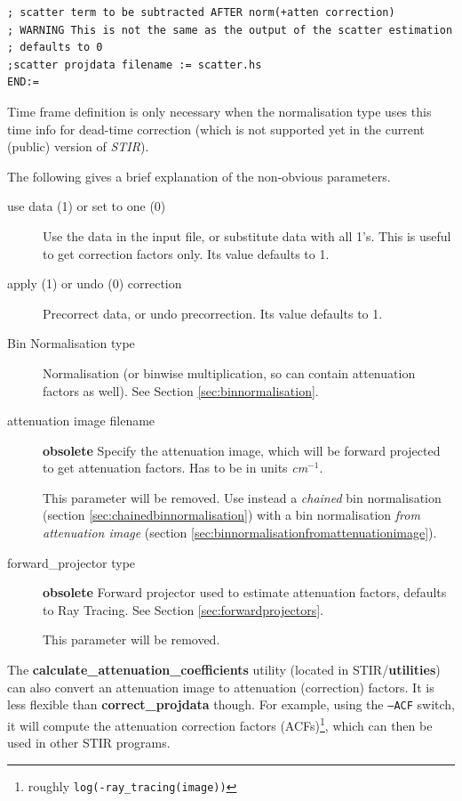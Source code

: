 \documentclass{article}
\begin{document}
{{\begin{verbatim}
; scatter term to be subtracted AFTER norm(+atten correction)
; WARNING This is not the same as the output of the scatter estimation
; defaults to 0 
;scatter projdata filename := scatter.hs
END:=
\end{verbatim}


Time frame definition is only necessary when the normalisation 
type uses this time info for dead-time correction (which is not 
supported yet in the current (public) version of \textit{STIR}).


The following gives a brief explanation of the non-obvious parameters. 

\begin{description}

\item[use data (1) or set to one (0)]
Use the data in the input file, or substitute data with all 1's. 
This is useful to get correction factors only. Its value defaults 
to 1.

\item[apply (1) or undo (0) correction]
Precorrect data, or undo precorrection. Its value defaults to 
1.

\item[Bin Normalisation type]
Normalisation (or binwise multiplication, so can contain attenuation 
factors as well). See Section \ref{sec:binnormalisation}.


\item[attenuation image filename] \textbf{obsolete}
Specify the attenuation image, which will be forward projected 
to get attenuation factors. Has to be in units \textit{cm}$^{\mathit{-1}}$.


This parameter will be removed. Use instead a \textit{chained} 
bin normalisation (section \ref{sec:chainedbinnormalisation}) 
with a bin normalisation 
\textit{from attenuation image} (section \ref{sec:binnormalisationfromattenuationimage}).


\item[forward\_projector type] \textbf{obsolete}
Forward projector used to estimate attenuation factors, defaults 
to Ray Tracing. See Section \ref{sec:forwardprojectors}.

This parameter will be removed.
\end{description}

The \textbf{calculate\_attenuation\_coefficients} utility (located in STIR/\textbf{utilities})
can also convert an attenuation image to attenuation (correction) factors. It is less
flexible than \textbf{correct\_projdata} though. For example, using the \texttt{--ACF} switch,
it will compute the attenuation correction factors (ACFs)\footnote{roughly
\texttt{log(-ray\_tracing(image))}}, which can then be used in other STIR programs.


}}
\end{document}
